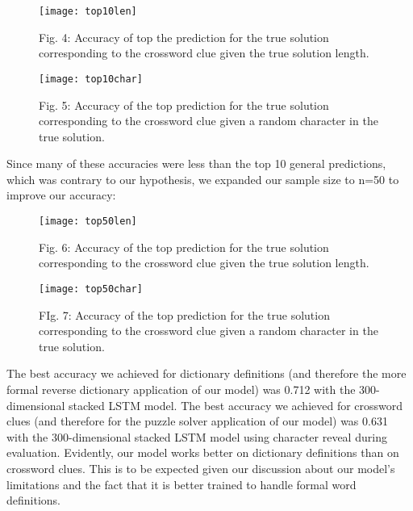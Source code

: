 \documentclass{article} %
\begin{document}
\begin{figure}
	\texttt{[image: top10len]}
	\caption{Fig. 4: Accuracy of top the prediction for the true solution corresponding to the crossword clue given the true solution length.}
\end{figure}

\begin{figure}
	\texttt{[image: top10char]}
	\caption{Fig. 5: Accuracy of the top prediction for the true solution corresponding to the crossword clue given a random character in the true solution.}
\end{figure}

Since many of these accuracies were less than the top 10 general predictions, which was contrary to our hypothesis, we expanded our sample size to n=50 to improve our accuracy:

\begin{figure}
	\texttt{[image: top50len]}
	\caption{Fig. 6: Accuracy of the top prediction for the true solution corresponding to the crossword clue given the true solution length.}
\end{figure}

\begin{figure}
	\texttt{[image: top50char]}
	\caption{FIg. 7: Accuracy of the top prediction for the true solution corresponding to the crossword clue given a random character in the true solution.}
\end{figure}


The best accuracy we achieved for dictionary definitions (and therefore the more formal reverse dictionary application of our model) was 0.712 with the 300-dimensional stacked LSTM model. The best accuracy we achieved for crossword clues (and therefore for the puzzle solver application of our model) was 0.631 with the 300-dimensional stacked LSTM model using character reveal during evaluation. 
Evidently, our model works better on dictionary definitions than on crossword clues. This is to be expected given our discussion about our model’s limitations and the fact that it is better trained to handle formal word definitions. 
\end{document}

